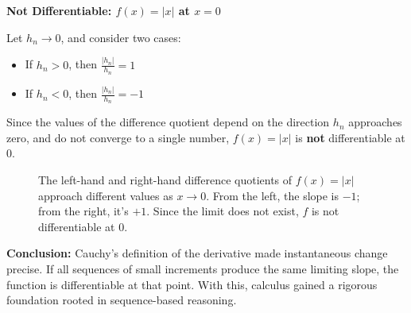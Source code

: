     
  

\textbf{Not Differentiable: \( f(x) = |x| \) at \( x = 0 \)}  

    Let \( h_n \to 0 \), and consider two cases:

    \begin{itemize}
        \item If \( h_n > 0 \), then \( \frac{|h_n|}{h_n} = 1 \)
        \item If \( h_n < 0 \), then \( \frac{|h_n|}{h_n} = -1 \)
    \end{itemize}

    Since the values of the difference quotient depend on the direction \( h_n \) approaches zero, and do not converge to a single number, \( f(x) = |x| \) is \textbf{not} differentiable at 0.




\begin{figure}[H]
\centering
{}
\caption{
The left-hand and right-hand difference quotients of \( f(x) = |x| \) approach different values as \( x \to 0 \). From the left, the slope is \(-1\); from the right, it’s \(+1\). Since the limit does not exist, \( f \) is not differentiable at 0.
}
\end{figure}






\textbf{Conclusion:} Cauchy’s definition of the derivative made instantaneous change precise. If all sequences of small increments produce the same limiting slope, the function is differentiable at that point. With this, calculus gained a rigorous foundation rooted in sequence-based reasoning.



